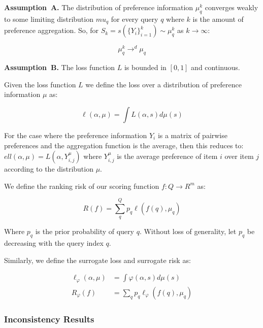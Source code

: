 \documentclass[a4paper,10pt]{article}
\newenvironment{assumption}[1][]{\par\medskip
   \noindent \textbf{Assumption~#1.} \rmfamily}{\medskip}
\begin{document}
\begin{assumption}[A]
  The distribution of preference information \(\mu_q^k\) converges weakly to some limiting distribution \(mu_q\) for every query \(q\) where \(k\) is the amount of preference aggregation. So, for \(S_k = s(\{Y_i\}_{i=1}^k) \sim \mu_q^k\) as \(k \rightarrow \infty\):

  \begin{equation}
    \mu_q^k \rightarrow^d \mu_q
  \end{equation}

\end{assumption}

\begin{assumption}[B]
  The loss function \(L\) is bounded in \([0,1]\) and continuous.
\end{assumption}

Given the loss function \(L\) we define the loss over a distribution of preference information \(\mu\) as:

\begin{equation}
  \ell(\alpha, \mu) = \int L(\alpha, s) d\mu(s)
\end{equation}

For the case where the preference information \(Y_i\) is a matrix of pairwise preferences and the aggregation function is the average, then this reduces to: \(ell(\alpha, \mu) = L(\alpha, Y_{i,j}^\mu)\) where \(Y_{i,j}^\mu\) is the average preference of item \(i\) over item \(j\) according to the distribution \(\mu\).

We define the ranking risk of our scoring function \(f: Q \rightarrow R^m\) as:

\begin{equation}
  R(f) = \sum_q^Q p_q \ell(f(q), \mu_q)
\end{equation}

Where \(p_q\) is the prior probability of query \(q\). Without loss of generality, let \(p_q\) be decreasing with the query index \(q\).

Similarly, we define the surrogate loss and surrogate risk as:

\begin{align}
  \ell_\varphi(\alpha, \mu) &= \int \varphi(\alpha, s) d\mu(s) \\
  R_\varphi(f) &= \sum_qp_q\ell_\varphi(f(q), \mu_q)
\end{align}

\subsubsection{Inconsistency Results}
\end{document}
